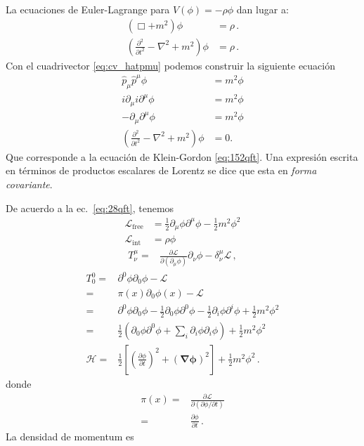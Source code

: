 La ecuaciones de Euler-Lagrange para $V(\phi)=-\rho\phi$ dan lugar a:
\begin{align}
  \label{eq:30qft}
  (\Box+m^2)\phi&=\rho\,.\nonumber\\
  \left(\frac{\partial^2}{\partial t^2}-\nabla^2+m^2\right)\phi&=\rho\,.
\end{align}
Con el cuadrivector \eqref{eq:cv_hatpmu} podemos construir la
siguiente ecuación
\begin{align}
  \hat{p}_\mu\hat{p}^\mu\phi&=m^2\phi\nonumber\\
  i\partial_\mu i\partial^\mu\phi&=m^2\phi\nonumber\\
  -\partial_\mu\partial^\mu\phi&=m^2\phi\nonumber\\
  \label{eq:waveec}
  \left(\frac{\partial^2}{\partial t^2}-\nabla^2+m^2\right)\phi&=0.
\end{align}
Que corresponde a la ecuación de Klein-Gordon \eqref{eq:152qft}. Una expresión escrita en términos de productos escalares de Lorentz se dice que esta en \emph{forma covariante}. 

De acuerdo a la ec.~\eqref{eq:28qft}, tenemos
\begin{align}
\mathcal{L}_{\text{free}}&=\frac{1}{2}\partial_\mu\phi\partial^\mu\phi-\frac{1}{2} m^2\phi^2\nonumber\\
\label{eq:31qft}
\mathcal{L}_{\text{int}}&=\rho\phi
\end{align}
\begin{align}
  T^\mu_\nu=&\frac{\partial\mathcal{L}}{\partial(\partial_\mu\phi)}{\partial_\nu\phi}-\delta^\mu_\nu\mathcal{L}\,,
\end{align}
\begin{align}
    T^0_0=&\partial^0\phi\partial_0\phi-\mathcal{L}\nonumber\\
    =&\pi(x)\partial_0\phi(x)-\mathcal{L}\nonumber\\
=&\partial^0\phi\partial_0\phi-\frac{1}{2}\partial_0\phi\partial^0\phi-\frac{1}{2}\partial_i\phi\partial^i\phi+\frac{1}{2}m^2\phi^2\nonumber\\
    =&\frac{1}{2}\left(\partial_0\phi\partial^0\phi+\sum_i\partial_i\phi\partial_i\phi\right)+\frac{1}{2}m^2\phi^2\nonumber\\
   \mathcal{H} =&\frac{1}{2}\left[\left(\frac{\partial\phi}{\partial t}\right)^2+
      \left(\boldsymbol{\nabla\phi}\right)^2\right]+\frac{1}{2}m^2\phi^2\,.
\end{align}
donde
\begin{align}
  \pi(x)=&\frac{\partial\mathcal{L}}{\partial\left(\partial\phi/\partial t\right)}\nonumber\\
  =&\frac{\partial\phi}{\partial t}\,.
\end{align}
La densidad de momentum es


